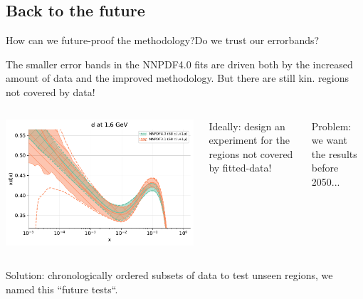 \newcommand{\hlme}[1]{{\color{red}\bf #1}}

\author[Juan Cruz-Martinez]{}

\subsection{Back to the future}

\begin{frame}{How can we future-proof the methodology?}{Do we trust our errorbands?}

    \small
    The smaller error bands in the NNPDF4.0 fits are driven both by the increased amount of data and the
    improved methodology.
    But there are still kin. regions not covered by data!

    \begin{columns}
        \includegraphics[width=1.0\textwidth]{juan_future_hyperopt/dquark.pdf}

         \vspace{-2.3cm} {

            Ideally: design an experiment for the regions not covered by fitted-data!

            \vspace{0.3cm}

            Problem: we want the results before 2050...

        }
    \end{columns}

    \vspace{-0.3cm}

    \begin{columns}
        Solution: chronologically ordered subsets of data to test unseen regions, we named this ``future tests``.


\end{columns}
\end{frame}
